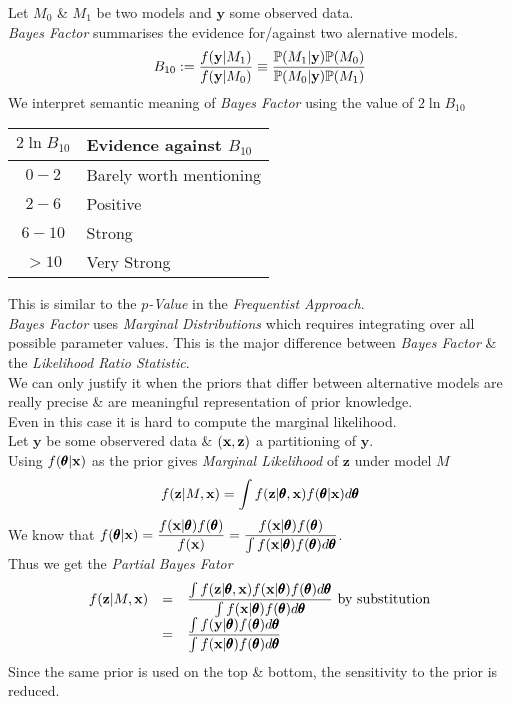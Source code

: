 \documentclass[11pt,a4paper]{article}
\begin{document}
Let $M_0$ \& $M_1$ be two models and $\textbf{y}$ some observed data.\\
\textit{Bayes Factor} summarises the evidence for/against two alernative models.
$$B_{10}:=\dfrac{f(\textbf{y}|M_1)}{f(\textbf{y}|M_0)}\equiv\dfrac{\mathbb{P}(M_1|\textbf{y})\mathbb{P}(M_0)}{\mathbb{P}(M_0|\textbf{y})\mathbb{P}(M_1)}$$
We interpret semantic meaning of \textit{Bayes Factor} using the value of $2\ln B_{10}$
\begin{center}
\begin{tabular}{c|l}
$2\ln B_{10}$&Evidence against $B_{10}$\\
\hline
$0-2$&Barely worth mentioning\\
$2-6$&Positive\\
$6-10$&Strong\\
$>10$&Very Strong\\\hline
\end{tabular}
\end{center}
\nb This is similar to the \textit{$p$-Value} in the \textit{Frequentist Approach}.\\

\textit{Bayes Factor} uses \textit{Marginal Distributions} which requires integrating over all possible parameter values. This is the major difference between \textit{Bayes Factor} \& the \textit{Likelihood Ratio Statistic}.\\

We can only justify it when the priors that differ between alternative models are really precise \& are meaningful representation of prior knowledge.\\
Even in this case it is hard to compute the marginal likelihood.\\

Let $\textbf{y}$ be some observered data \& $(\textbf{x},\textbf{z})$ a partitioning of $\textbf{y}$.\\
Using $f(\pmb\theta|\textbf{x})$ as the prior gives \textit{Marginal Likelihood} of $\textbf{z}$ under model $M$
$$f(\textbf{z}|M,\textbf{x})=\int f(\textbf{z}|\pmb\theta,\textbf{x})f(\pmb\theta|\textbf{x})d\pmb\theta$$
We know that $f(\pmb\theta|\textbf{x})=\dfrac{f(\textbf{x}|\pmb\theta)f(\pmb\theta)}{f(\textbf{x})}=\dfrac{f(\textbf{x}|\pmb\theta)f(\pmb\theta)}{\int f(\textbf{x}|\pmb\theta)f(\pmb\theta)d\pmb\theta}$.\\
Thus we get the \textit{Partial Bayes Fator}
\[\begin{array}{rcl}
f(\textbf{z}|M,\textbf{x})&=&\dfrac{\int f(\textbf{z}|\pmb\theta,\textbf{x})f(\textbf{x}|\pmb\theta)f(\pmb\theta)d\pmb\theta}{\int f(\textbf{x}|\pmb\theta)f(\pmb\theta)d\pmb\theta}\text{ by substitution}\\
&=&\dfrac{\int f(\textbf{y}|\pmb\theta)f(\pmb\theta)d\pmb\theta}{\int f(\textbf{x}|\pmb\theta)f(\pmb\theta)d\pmb\theta}
\end{array}\]
Since the same prior is used on the top \& bottom, the sensitivity to the prior is reduced.\\
\end{document}

